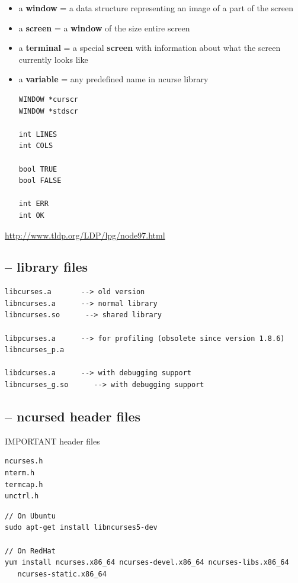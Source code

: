 \begin{itemize}
  \item a {\bf window} = a data structure representing an image of a part of the
  screen
  
  
  \item a {\bf screen} = a {\bf window} of the size entire screen
  
  \item a {\bf terminal} = a special {\bf screen} with information about what
  the screen currently looks like
  
  \item a {\bf variable} = any predefined name in ncurse library 
  
\begin{verbatim}
WINDOW *curscr
WINDOW *stdscr

int LINES
int COLS

bool TRUE
bool FALSE

int ERR
int OK
\end{verbatim}
\end{itemize}

\url{http://www.tldp.org/LDP/lpg/node97.html}

\subsection{-- library files}

\begin{verbatim}
libcurses.a       --> old version
libncurses.a      --> normal library
libncurses.so      --> shared library

libpcurses.a      --> for profiling (obsolete since version 1.8.6)
libncurses_p.a
      
libdcurses.a      --> with debugging support
libncurses_g.so      --> with debugging support

\end{verbatim}


\subsection{-- ncursed header files}
\label{sec:ncurses-dev}

IMPORTANT header files
\begin{verbatim}
ncurses.h
nterm.h
termcap.h
unctrl.h
\end{verbatim}


\begin{verbatim}
// On Ubuntu
sudo apt-get install libncurses5-dev

// On RedHat
yum install ncurses.x86_64 ncurses-devel.x86_64 ncurses-libs.x86_64 
   ncurses-static.x86_64
\end{verbatim}


